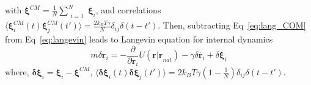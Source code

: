 \documentclass[../talant.diss.submit.tex]{subfiles}
\begin{document}
%
%
with $\bm{\xi}^{CM} = \frac{1}{N} \sum_{\substack{i=1}}^{N} \bm{\xi}_i$, and correlations 
$\langle \bm{\xi}_i^{CM}(t) \bm{\xi}_j^{CM}(t')\rangle = \frac{2k_B T\gamma}{N} \delta_{ij} \delta(t-t')$.
Then, subtracting Eq~\ref{eq:lang_COM} from Eq~\ref{eq:langevin} leads to Langevin equation for internal
dynamics
%
%
\begin{equation}
  \label{eq:lang_intra}
  m\delta \ddot{\bm{r}}_i =
  -\frac{ \partial}{\partial{\bm{r}_i}} U(\bm{r|r}_{nat})  
  -\gamma \delta \dot{\bm{r}_i}
  +\delta \bm{\xi}_i
\end{equation}
%
%
where, $\bm{\delta{\xi}}_i = \bm{\xi}_i - \bm{\xi}^{CM}$,
$\langle \bm{\delta \xi}_i(t) \bm{\delta \xi}_j(t')\rangle =
2k_{B}T \gamma(1-\frac{1}{N}) \delta_{ij} \delta(t-t')$.

%
%
%
%
%
%
%
%
\end{document}
